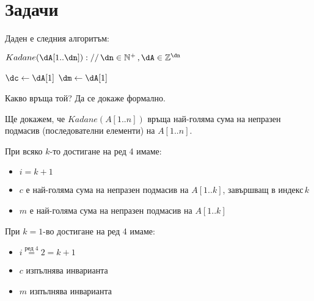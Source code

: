 \newpage

\section{Задачи}

\begin{problem}
	Даден е следния алгоритъм:
	\begin{pseudocode}
		
		$Kadane(\dA[1..\dn])://\,\dn\in\mathbb{N}^+\,,\dA\in\mathbb{Z}^{\dn}$
		\Mybegin
		{
			$\dc\leftarrow\dA[1]$\;
			$\dm\leftarrow\dA[1]$\;
			
			{
				\If{$\dA[\di]+\dc>\dA[i]$}{$\dc\leftarrow\dc+\dA[\di]$\;}
				\Else{$\dc\leftarrow\dA[\di]$\;}
				
				\If{$\dc>\dm$}{$\dm\leftarrow\dc$\;}
			}
			
			\KwRet{$\dm$\;}
		}
	\end{pseudocode}
	Какво връща той? Да се докаже формално.
\end{problem}

\begin{solution}
	Ще докажем, че $Kadane(A[1..n])$ връща най-голяма сума на непразен подмасив (последователни елементи) на $A[1..n]$.
\end{solution}

\begin{boxinvariant*}{}{}
	При всяко $k$-то достигане на ред 4 имаме:
	\begin{itemize}
		\item $i=k+1$
		\item $c$ е най-голяма сума на непразен подмасив на $A[1..k]$, завършващ в индекс$\,k$
		\item $m$ е най-голяма сума на непразен подмасив на $A[1..k]$
	\end{itemize}
\end{boxinvariant*}

\begin{base}
	При $k=1$-во достигане на ред 4 имаме:
	\begin{itemize}
		\item $i\overset{\text{ред 4}}=2=k+1$
		\item $c$ изпълнява инварианта
		\item $m$ изпълнява инварианта
	\end{itemize}
\end{base}


